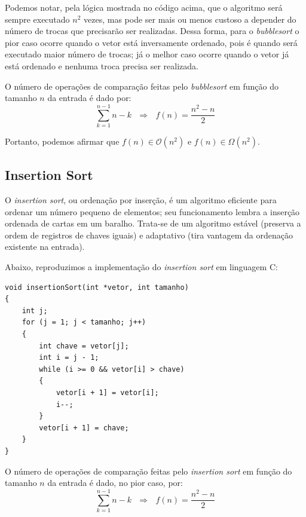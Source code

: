 \documentclass[fontsize=10pt]{article}
\begin{document}
\quad Podemos notar, pela lógica mostrada no código acima, que o algoritmo será sempre executado $n^2$ vezes, mas pode ser mais ou menos custoso a depender do número de trocas que precisarão ser realizadas. Dessa forma, para o \textit{bubblesort} o pior caso ocorre quando o vetor está inversamente ordenado, pois é quando será executado maior número de trocas; já o melhor caso ocorre quando o vetor já está ordenado e nenhuma troca precisa ser realizada.

\quad O número de operações de comparação feitas pelo \textit{bubblesort} em função do tamanho $n$ da entrada é dado por:
\begin{equation}
    \sum_{k=1}^{n-1} n - k \ \ \ \Longrightarrow \ \ \ f(n) = \frac{n^2 - n}{2}
\end{equation}

\quad Portanto, podemos afirmar que $f(n) \in \mathcal{O}(n^2)$ e $f(n) \in \Omega(n^2)$.

\subsection{Insertion Sort}

\quad O \textit{insertion sort}, ou ordenação por inserção, é um algoritmo eficiente para ordenar um número pequeno de elementos; seu funcionamento lembra a inserção ordenada de cartas em um baralho. Trata-se de um algoritmo estável (preserva a ordem de registros de chaves iguais) e adaptativo (tira vantagem da ordenação existente na entrada).

\newpage
\quad Abaixo, reproduzimos a implementação do \textit{insertion sort} em linguagem C:

\begin{lstlisting}
void insertionSort(int *vetor, int tamanho)
{
    int j;
    for (j = 1; j < tamanho; j++)
    {
        int chave = vetor[j];
        int i = j - 1;
        while (i >= 0 && vetor[i] > chave)
        {
            vetor[i + 1] = vetor[i];
            i--;
        }
        vetor[i + 1] = chave;
    }
}
\end{lstlisting}

\quad O número de operações de comparação feitas pelo \textit{insertion sort} em função do tamanho $n$ da entrada é dado, no pior caso, por:
\begin{equation}
    \sum_{k=1}^{n-1} n - k \ \ \ \Longrightarrow \ \ \ f(n) = \frac{n^2 - n}{2}
\end{equation}
\end{document}
